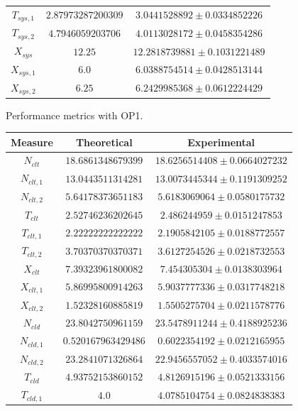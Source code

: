 \begin{figure}
\begin{center}
\begin{tabular}{|c||c|c|}
$T_{sys,1}$  & $2.87973287200309$ & $3.0441528892\pm 0.0334852226$ \\ 
$T_{sys,2}$  & $4.7946059203706$ & $4.0113028172\pm 0.0458354286$ \\ 
$X_{sys}$  & $12.25$ & $12.2818739881\pm 0.1031221489$ \\ 
$X_{sys,1}$  & $6.0$ & $6.0388754514\pm 0.0428513144$ \\ 
$X_{sys,2}$  & $6.25$ & $6.2429985368\pm 0.0612224429$ \\ 
\hline 
		\end{tabular}
	\end{center}
	\caption{Performance metrics with OP1.}
	\label{tbl:evaluation-performance-metrics-1}
\end{figure}

\begin{figure}
	\begin{center}
		\begin{tabular}{|c||c|c|}
\hline
Measure & Theoretical & Experimental \\
\hline
$N_{clt}$  & $18.6861348679399$ & $18.6256514408\pm 0.0664027232$ \\ 
$N_{clt,1}$  & $13.0443511314281$ & $13.0073445344\pm 0.1191309252$ \\ 
$N_{clt,2}$  & $5.64178373651183$ & $5.6183069064\pm 0.0580175732$ \\ 
$T_{clt}$  & $2.52746236202645$ & $2.486244959\pm 0.0151247853$ \\ 
$T_{clt,1}$  & $2.22222222222222$ & $2.1905842105\pm 0.0188772557$ \\ 
$T_{clt,2}$  & $3.70370370370371$ & $3.6127254526\pm 0.0218732553$ \\ 
$X_{clt}$  & $7.39323961800082$ & $7.454305304\pm 0.0138303964$ \\ 
$X_{clt,1}$  & $5.86995800914263$ & $5.9037777336\pm 0.0317748218$ \\ 
$X_{clt,2}$  & $1.52328160885819$ & $1.5505275704\pm 0.0211578776$ \\ 
\hline 
$N_{cld}$  & $23.8042750961159$ & $23.5478911244\pm 0.4188925236$ \\ 
$N_{cld,1}$  & $0.520167963429486$ & $0.6022354192\pm 0.0212165955$ \\ 
$N_{cld,2}$  & $23.2841071326864$ & $22.9456557052\pm 0.4033574016$ \\ 
$T_{cld}$  & $4.93752153860152$ & $4.8126915196\pm 0.0521333156$ \\ 
$T_{cld,1}$  & $4.0$ & $4.0785104754\pm 0.0824838383$ \\ 

\end{tabular}
\end{center}
\end{figure}

